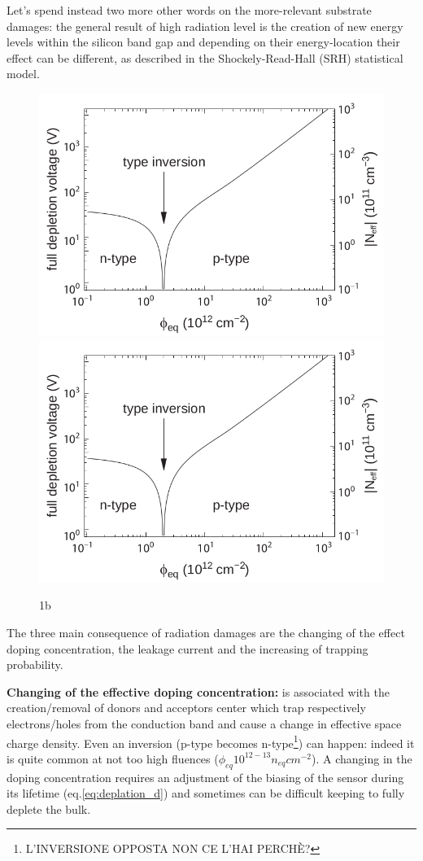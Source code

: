     Let's spend instead two more other words on the more-relevant substrate damages: the general result of high radiation level is the creation of new energy levels within the silicon band gap and depending on their energy-location their effect can be different, as described in the Shockely-Read-Hall (SRH) statistical model.
    \begin{figure}
        \centering
        \includegraphics[width=.8\linewidth]{figures/overview/type_inversion.png}
        \includegraphics[width=.8\linewidth]{figures/overview/type_inversion.png}
        \caption{1b}
        \label{fig:type_inversion}
    \end{figure}
    The three main consequence of radiation damages are the changing of the effect doping concentration, the leakage current and the increasing of trapping probability.

    \textbf{Changing of the effective doping concentration:} is associated with the creation/removal of donors and acceptors center which trap respectively electrons/holes from the conduction band and cause a change in effective space charge density. Even an inversion (p-type becomes n-type\footnote{L'INVERSIONE OPPOSTA NON CE L'HAI PERCHÈ?}) can happen: indeed it is quite common at not too high fluences ($\phi_{eq} 10^{12-13}n_{eq}cm^{-2}$). 
    A changing in the doping concentration requires an adjustment of the biasing of the sensor during its lifetime (eq.\ref{eq:deplation_d}) and sometimes can be difficult keeping to fully deplete the bulk.

